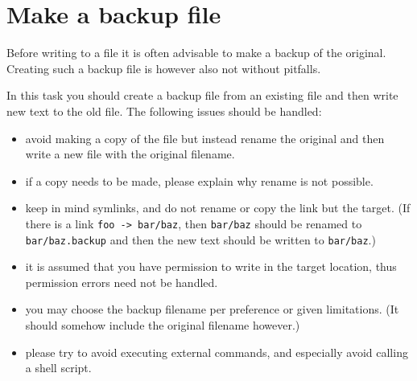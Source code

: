 



\pagebreak{}
\section*{Make a backup file}

Before writing to a file it is often advisable to make a backup of the
original. Creating such a backup file is however also not without
pitfalls.

In this task you should create a backup file from an existing file and
then write new text to the old file. The following issues should be
handled:

\begin{itemize}
\item
  avoid making a copy of the file but instead rename the original and
  then write a new file with the original filename.
\item
  if a copy needs to be made, please explain why rename is not possible.
\item
  keep in mind symlinks, and do not rename or copy the link but the
  target. (If there is a link \texttt{foo -\textgreater{} bar/baz}, then
  \texttt{bar/baz} should be renamed to \texttt{bar/baz.backup} and then
  the new text should be written to \texttt{bar/baz}.)
\item
  it is assumed that you have permission to write in the target
  location, thus permission errors need not be handled.
\item
  you may choose the backup filename per preference or given
  limitations. (It should somehow include the original filename
  however.)
\item
  please try to avoid executing external commands, and especially avoid
  calling a shell script.
\end{itemize}

